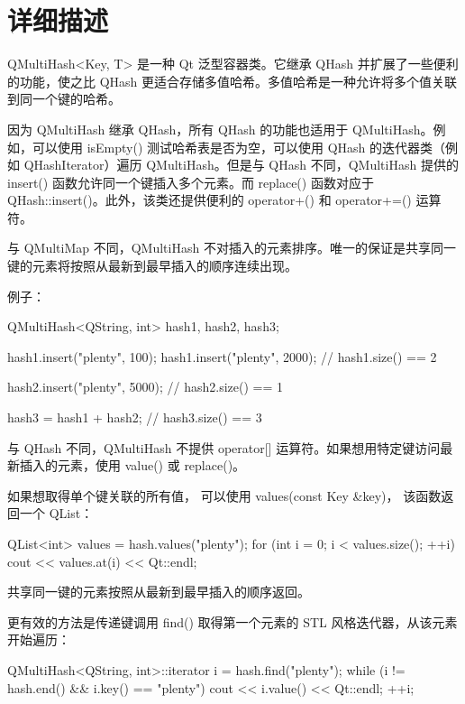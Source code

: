 \section{详细描述}

QMultiHash<Key, T> 是一种 Qt 泛型容器类。它继承 QHash 并扩展了一些便利的功能，使之比 QHash 更适合存储多值哈希。多值哈希是一种允许将多个值关联到同一个键的哈希。

因为 QMultiHash 继承 QHash，所有 QHash 的功能也适用于 QMultiHash。例如，可以使用 isEmpty() 测试哈希表是否为空，可以使用 QHash 的迭代器类（例如 QHashIterator）遍历 QMultiHash。但是与 QHash 不同，QMultiHash 提供的 insert() 函数允许同一个键插入多个元素。而 replace() 函数对应于 QHash::insert()。此外，该类还提供便利的 operator+() 和 operator+=() 运算符。

与 QMultiMap 不同，QMultiHash 不对插入的元素排序。唯一的保证是共享同一键的元素将按照从最新到最早插入的顺序连续出现。

例子：

\begin{cppcode}
QMultiHash<QString, int> hash1, hash2, hash3;

hash1.insert("plenty", 100);
hash1.insert("plenty", 2000);
// hash1.size() == 2

hash2.insert("plenty", 5000);
// hash2.size() == 1

hash3 = hash1 + hash2;
// hash3.size() == 3
\end{cppcode}


与 QHash 不同，QMultiHash 不提供 operator[] 运算符。如果想用特定键访问最新插入的元素，使用 value() 或 replace()。

如果想取得单个键关联的所有值，
可以使用 values(const Key \&key)，
该函数返回一个 QList：

\begin{cppcode}
QList<int> values = hash.values("plenty");
for (int i = 0; i < values.size(); ++i)
    cout << values.at(i) << Qt::endl;
\end{cppcode}

共享同一键的元素按照从最新到最早插入的顺序返回。

更有效的方法是传递键调用 find() 取得第一个元素的 STL 风格迭代器，从该元素开始遍历：

\begin{cppcode}
QMultiHash<QString, int>::iterator i = hash.find("plenty");
while (i != hash.end() && i.key() == "plenty") {
    cout << i.value() << Qt::endl;
    ++i;
}
\end{cppcode}

